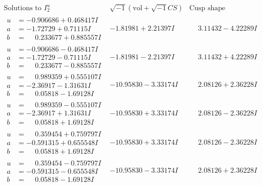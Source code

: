 \documentclass[1p]{elsarticle_modified}
\theoremstyle{definition}
\newcommand{\I}{\sqrt{-1}}
\begin{document}
$$\begin{array}{c|c|c}  
\text{Solutions to }I^u_{2}& \I (\text{vol} + \sqrt{-1}CS) & \text{Cusp shape}\\
 \hline 
\begin{aligned}
u &= -0.906686 + 0.468417 I \\
a &= -1.72729 + 0.71115 I \\
b &= \phantom{-}0.233677 + 0.885557 I\end{aligned}
 & -1.81981 + 2.21397 I & \phantom{-}3.11432 - 4.22289 I \\ \hline\begin{aligned}
u &= -0.906686 - 0.468417 I \\
a &= -1.72729 - 0.71115 I \\
b &= \phantom{-}0.233677 - 0.885557 I\end{aligned}
 & -1.81981 - 2.21397 I & \phantom{-}3.11432 + 4.22289 I \\ \hline\begin{aligned}
u &= \phantom{-}0.989359 + 0.555107 I \\
a &= -2.36917 - 1.31631 I \\
b &= \phantom{-}0.05818 - 1.69128 I\end{aligned}
 & -10.95830 - 3.33174 I & \phantom{-}2.08126 + 2.36228 I \\ \hline\begin{aligned}
u &= \phantom{-}0.989359 - 0.555107 I \\
a &= -2.36917 + 1.31631 I \\
b &= \phantom{-}0.05818 + 1.69128 I\end{aligned}
 & -10.95830 + 3.33174 I & \phantom{-}2.08126 - 2.36228 I \\ \hline\begin{aligned}
u &= \phantom{-}0.359454 + 0.759797 I \\
a &= -0.591315 + 0.655548 I \\
b &= \phantom{-}0.05818 + 1.69128 I\end{aligned}
 & -10.95830 + 3.33174 I & \phantom{-}2.08126 - 2.36228 I \\ \hline\begin{aligned}
u &= \phantom{-}0.359454 - 0.759797 I \\
a &= -0.591315 - 0.655548 I \\
b &= \phantom{-}0.05818 - 1.69128 I\end{aligned}
 & -10.95830 - 3.33174 I & \phantom{-}2.08126 + 2.36228 I \\ \hline\begin{aligned}

\end{aligned}
\end{array}$$
\end{document}
